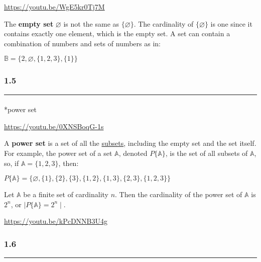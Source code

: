\documentclass[
  letterpaper,
  DIV=11,
  numbers=noendperiod]{scrreprt}
\makeatletter
\let\oldparagraph\paragraph
\renewcommand{\paragraph}{
    \@ifstar
      \xxxParagraphStar
      \xxxParagraphNoStar
  }
\newcommand{\xxxParagraphStar}[1]{\oldparagraph*{#1}\mbox{}}
\newcommand{\xxxParagraphNoStar}[1]{\oldparagraph{#1}\mbox{}}
\providecommand{\tightlist}{%
  \setlength{\itemsep}{0pt}\setlength{\parskip}{0pt}}
\makeatother
\begin{document}
\url{https://youtu.be/WgE5kr0Tj7M}

The {\textbf{empty set}} \(\varnothing\) is not the same as
\(\{ \varnothing \}\). The cardinality of \(\{ \varnothing \}\) is one
since it contains exactly one element, which is the empty set. A set can
contain a combination of numbers and sets of numbers as in:

\(\mathbb{B} = \{ 2, \varnothing, \{1, 2, 3\}, \{1\} \}\)

\subsubsection*{1.5}\label{section-8}

\begin{center}\rule{0.5\linewidth}{0.5pt}\end{center}

\paragraph*{power set}\label{power-set}

\url{https://youtu.be/0XNSBoqG-1s}

A {\textbf{power set}} is a set of all the \ul{subsets}, including the
empty set and the set itself. For example, the power set of a set
\(\mathbb{A}\), denoted \(P\{\mathbb{A}\}\), is the set of all subsets
of \(\mathbb{A}\), so, if \(\mathbb{A} = \{1,2,3\}\), then:

\(P\{\mathbb{A}\} = \{ \varnothing, \{1\}, \{2\}, \{3\}, \{1, 2\}, \{1,3\}, \{2,3\}, \{1, 2, 3\} \}\)

\begin{description}
\tightlist
\item[Cardinality of a power set]
Let \(\mathbb{A}\) be a finite set of cardinality \(n\). Then the
cardinality of the power set of \(\mathbb{A}\) is \(2^n\), or
\(\mid P\{\mathbb{A}\}=2^n \mid\).
\end{description}

\url{https://youtu.be/kPcDNNB3U4g}

\subsubsection*{1.6}\label{section-9}

\begin{center}\rule{0.5\linewidth}{0.5pt}\end{center}
\end{document}
